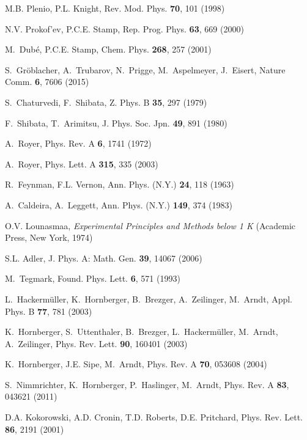 \documentclass[aps,pra,reprint,amsmath,amssymb,showpacs,nofootinbib,floatfix,onecolumn,12pt]{revtex4-1}
\begin{document}
\begin{thebibliography}{100}
M.B. Plenio, P.L. Knight, Rev. Mod. Phys. \textbf{70}, 101 (1998)

N.V. Prokof'ev, P.C.E. Stamp, Rep. Prog. Phys. \textbf{63}, 669 (2000)

M.~Dub{\'e}, P.C.E. Stamp, Chem. Phys. \textbf{268}, 257 (2001)

S.~Gr{\"o}blacher, A.~Trubarov, N.~Prigge, M.~Aspelmeyer, J.~Eisert, Nature
  Comm. \textbf{6}, 7606 (2015)

S.~Chaturvedi, F.~Shibata, Z. Phys. B \textbf{35}, 297 (1979)

F.~Shibata, T.~Arimitsu, J. Phys. Soc. Jpn. \textbf{49}, 891 (1980)

A.~Royer, Phys. Rev. A \textbf{6}, 1741 (1972)

A.~Royer, Phys. Lett. A \textbf{315}, 335 (2003)

R.~Feynman, F.L. Vernon, Ann. Phys. (N.Y.) \textbf{24}, 118 (1963)

A.~Caldeira, A.~Leggett, Ann. Phys. (N.Y.) \textbf{149}, 374 (1983)

O.V. Lounasmaa, \emph{Experimental Principles and Methods below 1 K} (Academic
  Press, New York, 1974)

S.L. Adler, J. Phys. A: Math. Gen. \textbf{39}, 14067 (2006)

M.~Tegmark, Found. Phys. Lett. \textbf{6}, 571 (1993)

L.~Hackerm{\"u}ller, K.~Hornberger, B.~Brezger, A.~Zeilinger, M.~Arndt, Appl.
  Phys. B \textbf{77}, 781 (2003)

K.~Hornberger, S.~Uttenthaler, B.~Brezger, L.~Hackerm{\"u}ller, M.~Arndt,
  A.~Zeilinger, Phys. Rev. Lett. \textbf{90}, 160401 (2003)

K.~Hornberger, J.E. Sipe, M.~Arndt, Phys. Rev. A \textbf{70}, 053608 (2004)

S.~Nimmrichter, K.~Hornberger, P.~Haslinger, M.~Arndt, Phys. Rev. A
  \textbf{83}, 043621 (2011)

D.A. Kokorowski, A.D. Cronin, T.D. Roberts, D.E. Pritchard, Phys. Rev. Lett.
  \textbf{86}, 2191 (2001)


\end{thebibliography}
\end{document}
